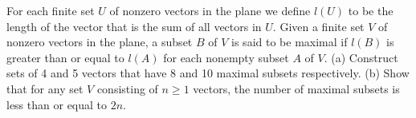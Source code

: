 For each finite set $U$ of nonzero vectors in the plane we define $l(U)$ to be the length of the vector that is the sum of all vectors in $U$. Given a finite set $V$ of nonzero vectors in the plane, a subset $B$ of $V$ is said to be maximal if $l(B)$ is greater than or equal to $l(A)$ for each nonempty subset $A$ of $V$.
(a) Construct sets of 4 and 5 vectors that have 8 and 10 maximal subsets respectively.
(b) Show that for any set $V$ consisting of $n \geq 1$ vectors, the number of maximal subsets is less than or equal to $2n$.
